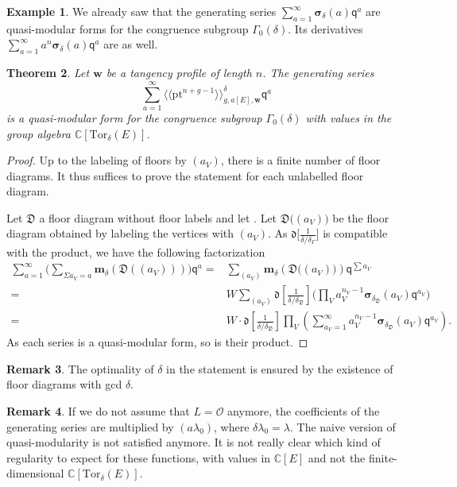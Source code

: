 \documentclass[pdftex]{sigma}
\newcommand{\Tor}{\mathrm{Tor}}
\newcommand{\pt}{\mathrm{pt}}
\renewcommand{\d}[1]{\dfk\left[ #1 \right]}
\newcommand{\CC}{\mathbb{C}}
\newcommand{\bfw}{ {\boldsymbol w} }
\newcommand{\bfm}{ {\boldsymbol m} }
\newcommand{\Dfk}{\mathfrak{D}}
\newcommand{\dfk}{\mathfrak{d}}
\newcommand{\sfq}{\mathsf{q}}
\renewcommand{\O}{\mathcal{O}}
\newcommand{\gen}[1]{\big\langle #1 \big\rangle}
\numberwithin{equation}{section}
\newtheorem{theo}{Theorem}[section]
\theoremstyle{definition}
\newtheorem{remarkk}[theo]{Remark}
\newtheorem{expl}[theo]{Example}
\begin{document}
\begin{expl}
 We already saw that the generating series $\sum_{a=1}^\infty \boldsymbol{\sigma}_\delta(a)\sfq^a$ are quasi-modular forms for the congruence subgroup $\Gamma_0(\delta)$. Its derivatives $\sum_{a=1}^\infty a^n\boldsymbol{\sigma}_\delta(a)\sfq^a$ are as well.
\end{expl}

\begin{theo}\label{theo-quasi-modularity}
Let $\bfw$ be a tangency profile of length $n$. The generating series
\[ \sum_{a=1}^\infty \gen{\gen{\pt^{n+g-1}}}_{g,a[E],\bfw}^\delta \sfq^a \]
is a quasi-modular form for the congruence subgroup $\Gamma_0(\delta)$ with values in the group algebra $\CC[\Tor_\delta(E)]$.
\end{theo}

\begin{proof}
Up to the labeling of floors by $(a_V)$, there is a finite number of floor diagrams. It thus suffices to prove the statement for each unlabelled floor diagram.

Let $\Dfk$ a floor diagram without floor labels and let \smash{$W=\prod_{E_b(\Dfk)}w_e\prod_{E_\circ(\Dfk)} w_e^2$}. Let $\Dfk\bigl((a_V)\bigr)$ be the floor diagram obtained by labeling the vertices with $(a_V)$. As $\dfk\big[\frac{1}{\delta/\delta_\Gamma}\big]$ is compatible with the product, we have the following factorization
\begin{align*}
 \sum_{a=1}^\infty \biggl(\sum_{\Sigma a_V=a} \bfm_\delta(\Dfk((a_V)))\biggr) \sfq^a ={} & \sum_{(a_V)}\boldsymbol{m}_\delta(\Dfk\bigl((a_V)\bigr))\sfq^{\sum a_V} \\
 = {}& W\sum_{(a_V)}\d{\frac{1}{\delta/\delta_\Dfk}}\biggl(\prod_V a_V^{n_V-1}\boldsymbol{\sigma}_{\delta_\Dfk}(a_V)\sfq^{a_V}\biggr) \\
 = {}& W\cdot \d{\frac{1}{\delta/\delta_\Dfk}}\prod_V\left(\sum_{a_V=1}^\infty a_V^{n_V-1}\boldsymbol{\sigma}_{\delta_\Dfk}(a_V) \sfq^{a_V}\right).
\end{align*}
As each series is a quasi-modular form, so is their product.
\end{proof}

\begin{remarkk}
 The optimality of $\delta$ in the statement is ensured by the existence of floor diagrams with gcd $\delta$.
\end{remarkk}

\begin{remarkk}
 If we do not assume that $L=\O$ anymore, the coefficients of the generating series are multiplied by $(a\lambda_0)$, where $\delta\lambda_0=\lambda$. The naive version of quasi-modularity is not satisfied anymore. It is not really clear which kind of regularity to expect for these functions, with values in $\CC[E]$ and not the finite-dimensional $\CC[\Tor_\delta(E)]$.
\end{remarkk}
\end{document}
